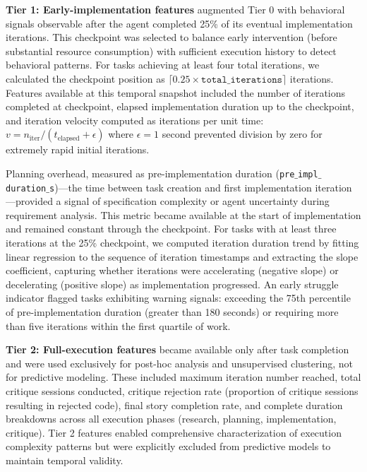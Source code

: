 \documentclass[]{article}
\begin{document}
\textbf{Tier 1: Early-implementation features} augmented Tier 0 with behavioral signals observable after the agent completed 25\% of its eventual implementation iterations. This checkpoint was selected to balance early intervention (before substantial resource consumption) with sufficient execution history to detect behavioral patterns. For tasks achieving at least four total iterations, we calculated the checkpoint position as $\lceil 0.25 \times \texttt{total\_iterations} \rceil$ iterations. Features available at this temporal snapshot included the number of iterations completed at checkpoint, elapsed implementation duration up to the checkpoint, and iteration velocity computed as iterations per unit time: $v = n_{\text{iter}} / (t_{\text{elapsed}} + \epsilon)$ where $\epsilon = 1$ second prevented division by zero for extremely rapid initial iterations.

Planning overhead, measured as pre-implementation duration (\texttt{pre\ensuremath{\_}impl\ensuremath{\_}duration\ensuremath{\_}s})—the time between task creation and first implementation iteration—provided a signal of specification complexity or agent uncertainty during requirement analysis. This metric became available at the start of implementation and remained constant through the checkpoint. For tasks with at least three iterations at the 25\% checkpoint, we computed iteration duration trend by fitting linear regression to the sequence of iteration timestamps and extracting the slope coefficient, capturing whether iterations were accelerating (negative slope) or decelerating (positive slope) as implementation progressed. An early struggle indicator flagged tasks exhibiting warning signals: exceeding the 75th percentile of pre-implementation duration (greater than 180 seconds) or requiring more than five iterations within the first quartile of work.

\textbf{Tier 2: Full-execution features} became available only after task completion and were used exclusively for post-hoc analysis and unsupervised clustering, not for predictive modeling. These included maximum iteration number reached, total critique sessions conducted, critique rejection rate (proportion of critique sessions resulting in rejected code), final story completion rate, and complete duration breakdowns across all execution phases (research, planning, implementation, critique). Tier 2 features enabled comprehensive characterization of execution complexity patterns but were explicitly excluded from predictive models to maintain temporal validity.
\end{document}
